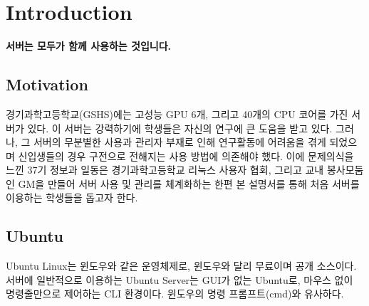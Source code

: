 \chapter{Introduction}

\graphicspath{{./chap1/images/}}   
\textbf{서버는 모두가 함께 사용하는 것입니다.}

\section{Motivation}
경기과학고등학교(\acs{GSHS})에는 고성능 \acs{GPU} 6개, 그리고 40개의 \acs{CPU} 코어를 가진 서버가 있다. 이 서버는 강력하기에 학생들은 자신의 연구에 큰 도움을 받고 있다. 그러나, 그 서버의 무분별한 사용과 관리자 부재로 인해 연구활동에 어려움을 겪게 되었으며 신입생들의 경우 구전으로 전해지는 사용 방법에 의존해야 했다. 이에 문제의식을 느낀 37기 정보과 일동은 경기과학고등학교 리눅스 사용자 협회, 그리고 교내 봉사모둠인 GM을 만들어 서버 사용 및 관리를 체계화하는 한편 본 설명서를 통해 처음 서버를 이용하는 학생들을 돕고자 한다.

\section{Ubuntu}
Ubuntu Linux는 윈도우와 같은 운영체제로, 윈도우와 달리 무료이며 공개 소스이다. 서버에 일반적으로 이용하는 Ubuntu Server는 \acs{GUI}가 없는 Ubuntu로, 마우스 없이 명령줄만으로 제어하는 \acs{CLI} 환경이다. 윈도우의 명령 프롬프트(cmd)와 유사하다.



